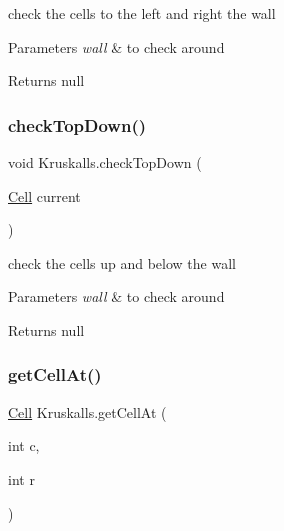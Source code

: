 check the cells to the left and right the wall 


\begin{DoxyParams}{Parameters}
{\em wall} & to check around\\
\hline
\end{DoxyParams}
\begin{DoxyReturn}{Returns}
null 
\end{DoxyReturn}
\mbox{\label{class_kruskalls_a69d7cccf1b3836b574bfa95f031b10e3}} 
\subsubsection{\texorpdfstring{checkTopDown()}{checkTopDown()}}
{\footnotesize\ttfamily void Kruskalls.\+check\+Top\+Down (\begin{DoxyParamCaption}\item[{\mbox{\hyperlink{class_cell}{Cell}}}]{current }\end{DoxyParamCaption})\hspace{0.3cm}{\ttfamily [private]}}



check the cells up and below the wall 


\begin{DoxyParams}{Parameters}
{\em wall} & to check around\\
\hline
\end{DoxyParams}
\begin{DoxyReturn}{Returns}
null 
\end{DoxyReturn}
\mbox{\label{class_kruskalls_afd439d8f48dbfe50dd810c70ea1a5b15}} 
\subsubsection{\texorpdfstring{getCellAt()}{getCellAt()}}
{\footnotesize\ttfamily \mbox{\hyperlink{class_cell}{Cell}} Kruskalls.\+get\+Cell\+At (\begin{DoxyParamCaption}\item[{int}]{c,  }\item[{int}]{r }\end{DoxyParamCaption})\hspace{0.3cm}{\ttfamily [private]}}



